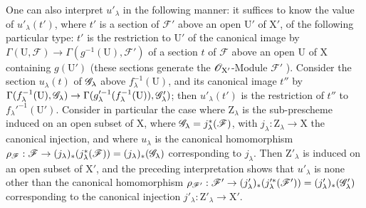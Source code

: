 \begin{env}[11.9.5]
One can also interpret $u'_\lambda$ in the following manner: it suffices to know the value of $u'_\lambda(t')$, where $t'$ is a section of $\mathscr{F}'$ above an open $\mathrm{U}'$ of $\mathrm{X}'$, of the following particular type: $t'$ is the restriction to $\mathrm{U}'$ of the canonical image by $\Gamma(\mathrm{U},\mathscr{F})\to\Gamma(g^{-1}(\mathrm{U}),\mathscr{F}')$ of a section $t$ of $\mathscr{F}$ above an open $\mathrm{U}$ of $\mathrm{X}$ containing $g(\mathrm{U}')$ (these sections generate the $\mathscr{O}_{\mathrm{X}'}$-Module $\mathscr{F}'$ ).
Consider the section $u_\lambda(t)$ of $\mathscr{G}_\lambda$ above $f_\lambda^{-1}(\mathrm{U})$, and its canonical image $t''$ by $\Gamma(f_\lambda^{-1}(\mathrm{U}),\mathscr{G}_\lambda)\to\Gamma(g_\lambda'^{-1}(f_\lambda^{-1}(\mathrm{U})),\mathscr{G}'_\lambda)$; then $u'_\lambda(t')$ is the restriction of $t''$ to $f_\lambda'^{-1}(\mathrm{U}')$.
Consider in particular the case where $\mathrm{Z}_\lambda$ is the sub-prescheme induced on an open subset of $\mathrm{X}$, where $\mathscr{G}_\lambda=j_\lambda^*(\mathscr{F})$, with $j_\lambda:\mathrm{Z}_\lambda\to\mathrm{X}$ the canonical injection, and where $u_\lambda$ is the canonical homomorphism $\rho_\mathscr{F}:\mathscr{F}\to(j_\lambda)_*(j_\lambda^*(\mathscr{F}))=(j_\lambda)_*(\mathscr{G}_\lambda)$  corresponding to $j_\lambda$.
Then $\mathrm{Z}'_\lambda$ is induced on an open subset of $\mathrm{X}'$, and the preceding interpretation shows that $u'_\lambda$ is none other than the canonical homomorphism $\rho_{\mathscr{F}'}:\mathscr{F}'\to(j'_\lambda)_*(j'^*_\lambda(\mathscr{F}'))=(j'_\lambda)_*(\mathscr{G}'_\lambda)$ corresponding to the canonical injection $j'_\lambda:\mathrm{Z}'_\lambda\to\mathrm{X}'$.
\end{env}

